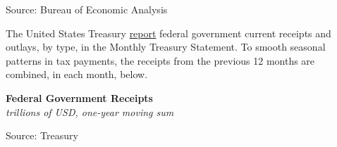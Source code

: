 \documentclass{report}
\makeatletter
\newcommand{\tbllink}[1]{\href{https://raw.githubusercontent.com/bdecon/US-chartbook/master/chartbook/data/#1}{\faTable}}
\newcommand*\short[1]{\expandafter\@gobbletwo\number\numexpr#1\relax}
\newcommand{\absnode}[3]{\node[below right, align=left] at (axis cs: #1,#2) {#3};}
\newcommand{\ltdateaxisticks}{
		date coordinates in=x, axis line style={draw=none},
		xmax={2023-11-30},
		max space between ticks=40,	    
		xtick={{2013-01-01}, {2014-01-01}, {2015-01-01}, {2016-01-01}, 
			{2017-01-01}, {2018-01-01}, {2019-01-01}, {2020-01-01}, {2021-01-01},
			{2022-01-01}, {2023-01-01}, {2024-01-01}},
		enlarge y limits={0.06}, enlarge x limits={0.01},
		xticklabel style={align=center, yshift=-2pt}, tick label style={inner sep=0pt},
		}
\newcommand{\bbar}[2]{extra #1 ticks = {{#2}}, extra #1 tick labels = ,
		extra #1 tick style = {grid=major, grid style={thick, black!25}},}
\newcommand{\stdline}[4]{\addplot[very thick, no markers, color=#1] 
		table [x=#2, y=#3, col sep=comma] {#4};	}
\newcommand{\rbar}{
		\fill[color=black!10] (axis cs:{2020-02-01},\pgfkeysvalueof{/pgfplots/ymin}) 
			rectangle (axis cs:{2020-05-01}, \pgfkeysvalueof{/pgfplots/ymax});}
\makeatother
\begin{document}
{\begin{minipage}{0.39\textwidth}
\footnotesize{Source: Bureau of Economic Analysis} \hfill \tbllink{fed_gov_rec_type.csv}
\end{minipage} \hspace{5mm} \begin{minipage}{0.33\textwidth}
\small 
\end{minipage}
\newpage
\begin{minipage}{0.76\textwidth}
\small The United States Treasury \href{https://fiscal.treasury.gov/reports-statements/mts/current.html}{report} federal government current receipts and outlays, by type, in the Monthly Treasury Statement. To smooth seasonal patterns in tax payments, the receipts from the previous 12 months are combined, in each month, below. 
\end{minipage}  

\begin{minipage}{0.43\textwidth}
\normalsize \textbf{Federal Government Receipts}\\
\footnotesize{\textit{trillions of USD, one-year moving sum}}
\vspace{3.2cm}

\hspace{2mm} 

\footnotesize{Source: Treasury} \hfill \tbllink{tmb_rec.csv} \ \ 
\end{minipage} \hspace{5mm}
\begin{minipage}{0.29\textwidth}
\small 
\end{minipage}
\vspace{4mm}

}
\end{document}
